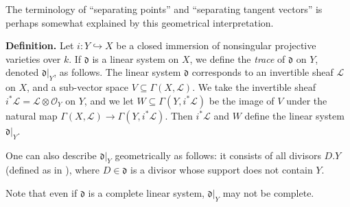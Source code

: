 {The terminology of \textquotedblleft{}separating points\textquotedblright{} and \textquotedblleft{}separating tangent vectors\textquotedblright{} is perhaps somewhat explained by this geometrical interpretation.

\medskip
\noindent\textbf{Definition.} Let $i\colon Y\hookrightarrow X$ be a closed immersion of nonsingular projective varieties over $k$. If $\mathfrak d$ is a linear system on $X$, we define the \emph{trace} of $\mathfrak d$ on $Y$, denoted $\mathfrak d|_Y$, as follows. The linear system $\mathfrak d$ corresponds to an invertible sheaf $\mathcal L$ on $X$, and a sub-vector space $V\subseteq\Gamma(X,\mathcal L)$. We take the invertible sheaf $i^*\mathcal L=\mathcal L\otimes\mathcal O_Y$ on $Y$, and we let $W\subseteq\Gamma(Y,i^*\mathcal L)$ be the image of $V$ under the natural map $\Gamma(X,\mathcal L)\to\Gamma(Y,i^*\mathcal L)$. Then $i^*\mathcal L$ and $W$ define the linear system $\mathfrak d|_Y$.

One can also describe $\mathfrak d|_Y$ geometrically as follows: it consists of all divisors $D.Y$ (defined as in ), where $D\in\mathfrak d$ is a divisor whose support does not contain $Y$.

Note that even if $\mathfrak d$ is a complete linear system, $\mathfrak d|_Y$ may not be complete.
}

